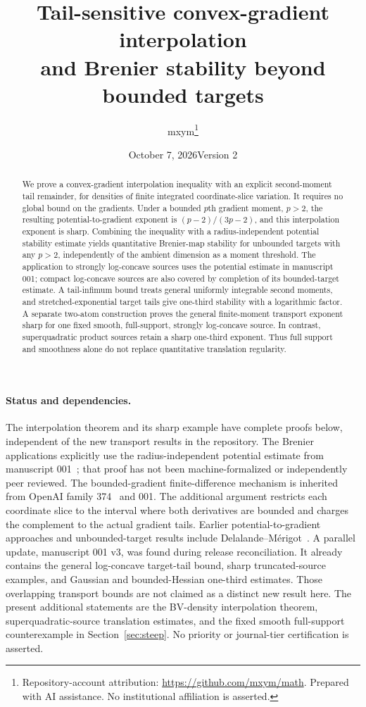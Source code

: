 \documentclass[11pt]{article}
\title{Tail-sensitive convex-gradient interpolation\\and Brenier stability beyond bounded targets}
\author{mxym\thanks{Repository-account attribution: \url{https://github.com/mxym/math}. Prepared with AI assistance. No institutional affiliation is asserted.}}
\date{October 7, 2026\quad Version 2}
\theoremstyle{remark}\newtheorem{remark}[theorem]{Remark}
\begin{document}
\maketitle
\begin{abstract}
We prove a convex-gradient interpolation inequality with an explicit second-moment tail remainder, for densities of finite integrated coordinate-slice variation. It requires no global bound on the gradients. Under a bounded $p$th gradient moment, $p>2$, the resulting potential-to-gradient exponent is $(p-2)/(3p-2)$, and this interpolation exponent is sharp. Combining the inequality with a radius-independent potential stability estimate yields quantitative Brenier-map stability for unbounded targets with any $p>2$, independently of the ambient dimension as a moment threshold. The application to strongly log-concave sources uses the potential estimate in manuscript 001; compact log-concave sources are also covered by completion of its bounded-target estimate. A tail-infimum bound treats general uniformly integrable second moments, and stretched-exponential target tails give one-third stability with a logarithmic factor. A separate two-atom construction proves the general finite-moment transport exponent sharp for one fixed smooth, full-support, strongly log-concave source. In contrast, superquadratic product sources retain a sharp one-third exponent. Thus full support and smoothness alone do not replace quantitative translation regularity.
\end{abstract}
\paragraph{Status and dependencies.}
The interpolation theorem and its sharp example have complete proofs below, independent of the new transport results in the repository. The Brenier applications explicitly use the radius-independent potential estimate from manuscript 001~\cite{M001}; that proof has not been machine-formalized or independently peer reviewed. The bounded-gradient finite-difference mechanism is inherited from OpenAI family 374~\cite{O374} and 001. The additional argument restricts each coordinate slice to the interval where both derivatives are bounded and charges the complement to the actual gradient tails. Earlier potential-to-gradient approaches and unbounded-target results include Delalande--M\'erigot~\cite{DM}. A parallel update, manuscript 001 v3, was found during release reconciliation. It already contains the general log-concave target-tail bound, sharp truncated-source examples, and Gaussian and bounded-Hessian one-third estimates. Those overlapping transport bounds are not claimed as a distinct new result here. The present additional statements are the BV-density interpolation theorem, superquadratic-source translation estimates, and the fixed smooth full-support counterexample in Section~\ref{sec:steep}. No priority or journal-tier certification is asserted.
\end{document}
